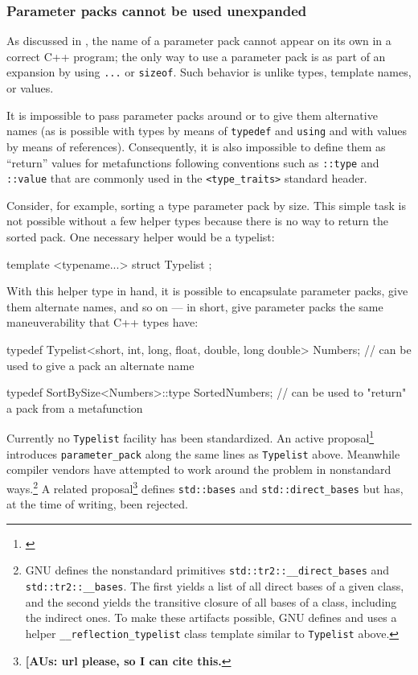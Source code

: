 \subsubsection[Parameter packs cannot be used unexpanded]{Parameter packs cannot be used unexpanded}\label{parameter-packs-cannot-be-used-unexpanded}

As discussed in , the name of a
parameter pack cannot appear on its own in a correct C++ program; the
only way to use a parameter pack is as part of an expansion by using
\lstinline!...! or \lstinline!sizeof!. Such behavior is unlike types, template
names, or values.

It is impossible to pass parameter packs around or to give them
alternative names (as is possible with types by means of
\lstinline!typedef! and \lstinline!using! and with values by means of
references). Consequently, it is also impossible to define them as
``return'' values for metafunctions following conventions such as
\lstinline!::type! and \lstinline!::value! that are commonly used in the
\lstinline!<type_traits>! standard header.

Consider, for example, sorting a type parameter pack by size. This
simple task is not possible without a few helper types because there is
no way to return the sorted pack. One necessary helper would be a
typelist:

\begin{emcppslisting}
template <typename...> struct Typelist { };
\end{emcppslisting}
    

\noindent With this helper type in hand, it is possible to encapsulate parameter
packs, give them alternate names, and so on --- in short, give parameter
packs the same maneuverability that C++ types have:

\begin{emcppslisting}
typedef Typelist<short, int, long, float, double, long double> Numbers;
    // can be used to give a pack an alternate name

typedef SortBySize<Numbers>::type SortedNumbers;
    // can be used to "return" a pack from a metafunction
\end{emcppslisting}
    

\noindent Currently no \lstinline!Typelist! facility has been standardized. An active
proposal{\cprotect\footnote{\cite{spertus13}}}
introduces \lstinline!parameter_pack! along the same lines as
\lstinline!Typelist! above. Meanwhile compiler vendors have attempted to
work around the problem in nonstandard ways.{\cprotect\footnote{GNU
defines the nonstandard primitives
\lstinline!std::tr2::__direct_bases! and \lstinline!std::tr2::__bases!.
The first yields a list of all direct bases of a given class, and the
second yields the transitive closure of all bases of a class,
including the indirect ones. To make these artifacts possible, GNU
defines and uses a helper \lstinline!__reflection_typelist! class
  template similar to \lstinline!Typelist! above.}} A related
proposal{\cprotect\footnote{\textbf{[AUs: url please, so I can cite this.}}} defines
\lstinline!std::bases! and \lstinline!std::direct_bases! but has, at the time
of writing, been rejected.

